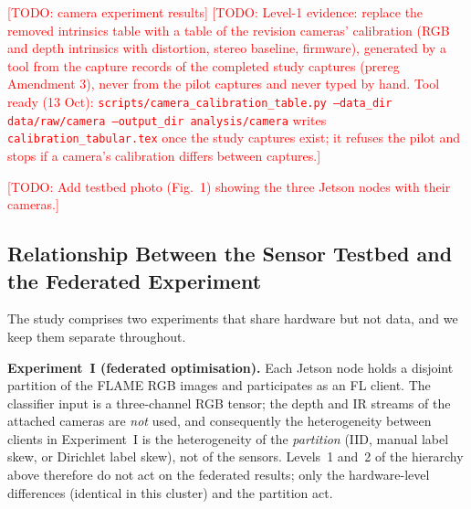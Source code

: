 \documentclass[journal]{IEEEtran}
\newcommand{\todo}[1]{\textcolor{red}{[TODO: #1]}}
\begin{document}
\todo{camera experiment results} \todo{Level-1 evidence: replace the removed intrinsics table with a table of the revision cameras' calibration (RGB and depth intrinsics with distortion, stereo baseline, firmware), generated by a tool from the capture records of the completed study captures (prereg Amendment 3), never from the pilot captures and never typed by hand. Tool ready (13 Oct): \texttt{scripts/camera\_calibration\_table.py --data\_dir data/raw/camera --output\_dir analysis/camera} writes \texttt{calibration\_tabular.tex} once the study captures exist; it refuses the pilot and stops if a camera's calibration differs between captures.}

\todo{Add testbed photo (Fig.~1) showing the three Jetson nodes with their cameras.}

\subsection{Relationship Between the Sensor Testbed and the Federated Experiment}
\label{sec:sensorlink}

The study comprises two experiments that share hardware but not data, and we keep them separate throughout.

\textbf{Experiment~I (federated optimisation).} Each Jetson node holds a disjoint partition of the FLAME RGB images and participates as an FL client. The classifier input is a three-channel RGB tensor; the depth and IR streams of the attached cameras are \emph{not} used, and consequently the heterogeneity between clients in Experiment~I is the heterogeneity of the \emph{partition} (IID, manual label skew, or Dirichlet label skew), not of the sensors. Levels~1 and~2 of the hierarchy above therefore do not act on the federated results; only the hardware-level differences (identical in this cluster) and the partition act.
\end{document}
